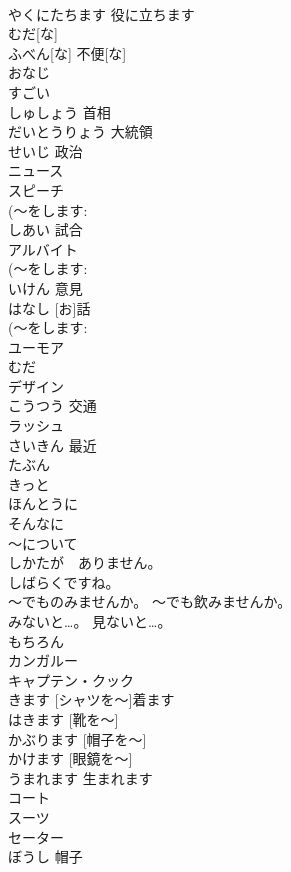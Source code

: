 \documentclass[8pt]{extreport}
\begin{document}
\begin{CJK}{UTF8}{min}
\\	やくにたちます	役に立ちます	
\\	むだ[な]			
\\	ふべん[な]	不便[な]	
\\	おなじ			
\\	すごい			
\\	しゅしょう	首相	
\\	だいとうりょう	大統領	
\\	せいじ	政治	
\\	ニュース			
\\	スピーチ			
\\	(～をします: 
\\	しあい	試合	
\\	アルバイト			
\\	(～をします: 
\\	いけん	意見	
\\	[お]はなし	[お]話	
\\	(～をします: 
\\	ユーモア			
\\	むだ			
\\	デザイン			
\\	こうつう	交通	
\\	ラッシュ			
\\	さいきん	最近	
\\	たぶん			
\\	きっと			
\\	ほんとうに			
\\	そんなに			
\\	～について			
\\	しかたが　ありません。			
\\	しばらくですね。			
\\	～でものみませんか。	～でも飲みませんか。	
\\	みないと…。	見ないと…。	
\\	もちろん			
\\	カンガルー			
\\	キャプテン・クック			
\\	[シャツを～]きます	[シャツを～]着ます	
\\	[くつを～] はきます	[靴を～]	
\\	[ぼうしを～]かぶります	[帽子を～]	
\\	[めがねを～]かけます	[眼鏡を～]	
\\	うまれます	生まれます	
\\	コート			
\\	スーツ			
\\	セーター			
\\	ぼうし	帽子	

\end{CJK}
\end{document}
